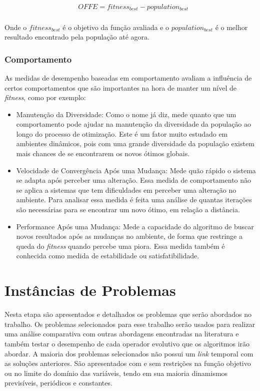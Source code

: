 \begin{equation}
\label{eq:offline_error}
\begin{split}
& OFFE = fitness_{best} - population_{best} \\
\end{split}
\end{equation}

Onde o $fitness_{best}$ é o objetivo da função avaliada e o $population_{best}$ é o melhor resultado encontrado pela população até agora.

\subsubsection{Comportamento}
As medidas de desempenho baseadas em comportamento avaliam a influência de certos comportamentos que são importantes na hora de manter um nível de \textit{fitness}, como por exemplo:

\begin{itemize}
	\item Manutenção da Diversidade: Como o nome já diz, mede quanto que um comportamento pode ajudar na manutenção da diversidade da população ao longo do processo de otimização. Este é um fator muito estudado em ambientes dinâmicos, pois com uma grande diversidade da população existem mais chances de se encontrarem os novos ótimos globais.
	
	\item Velocidade de Convergência Após uma Mudança: Mede quão rápido o sistema se adapta após perceber uma alteração. Essa medida de comportamento não se aplica a sistemas que tem dificuldades em perceber uma alteração no ambiente. Para analisar essa medida é feita uma análise de quantas iterações são necessárias para se encontrar um novo ótimo, em relação a distância.
	
	\item Performance Após uma Mudança: Mede a capacidade do algoritmo de buscar novos resultados após as mudanças no ambiente, de forma que restringe a queda do \textit{fitness} quando percebe uma piora. Essa medida também é conhecida como medida de estabilidade ou satisfatibilidade.
\end{itemize}

\section{Instâncias de Problemas}
\label{sec:revisao_dinamic_problems}
Nesta etapa são apresentados e detalhados os problemas que serão abordados no trabalho. Os problemas selecionados para esse trabalho serão usados para realizar uma análise comparativa com outras abordagens encontradas na literatura e também testar o desempenho de cada operador evolutivo que os algoritmos irão abordar. A maioria dos problemas selecionados não possui um \textit{link} temporal com as soluções anteriores. São apresentados com e sem restrições na função objetivo ou no limite do domínio das variáveis, tendo em sua maioria dinamismos previsíveis, periódicos e constantes.


